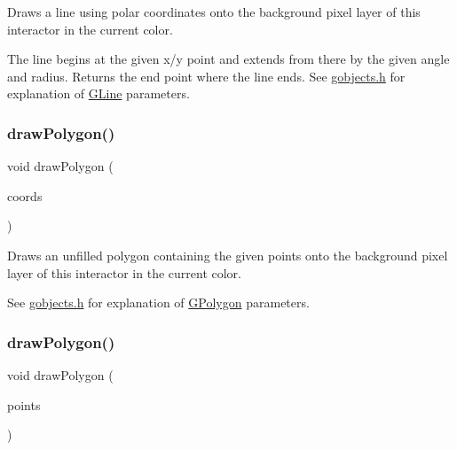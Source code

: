 Draws a line using polar coordinates onto the background pixel layer of this interactor in the current color. 

The line begins at the given x/y point and extends from there by the given angle and radius. Returns the end point where the line ends. See \mbox{\hyperlink{gobjects_8h_source}{gobjects.\+h}} for explanation of \mbox{\hyperlink{classGLine}{G\+Line}} parameters. \mbox{\label{classGDrawingSurface_afddec0a905108d8a8d6809a157f26776}} 
\subsubsection{\texorpdfstring{draw\+Polygon()}{drawPolygon()}\hspace{0.1cm}{\footnotesize\ttfamily [1/2]}}
{\footnotesize\ttfamily void draw\+Polygon (\begin{DoxyParamCaption}\item[{std\+::initializer\+\_\+list$<$ double $>$}]{coords }\end{DoxyParamCaption})\hspace{0.3cm}{\ttfamily [virtual]}}



Draws an unfilled polygon containing the given points onto the background pixel layer of this interactor in the current color. 

See \mbox{\hyperlink{gobjects_8h_source}{gobjects.\+h}} for explanation of \mbox{\hyperlink{classGPolygon}{G\+Polygon}} parameters. \mbox{\label{classGDrawingSurface_a021ee881e0d154dc4dd059698742889c}} 
\subsubsection{\texorpdfstring{draw\+Polygon()}{drawPolygon()}\hspace{0.1cm}{\footnotesize\ttfamily [2/2]}}
{\footnotesize\ttfamily void draw\+Polygon (\begin{DoxyParamCaption}\item[{std\+::initializer\+\_\+list$<$ \mbox{\hyperlink{classGPoint}{G\+Point}} $>$}]{points }\end{DoxyParamCaption})\hspace{0.3cm}{\ttfamily [virtual]}}



